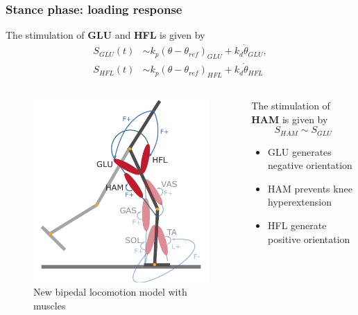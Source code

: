 \documentclass[10pt]{beamer}
\begin{document}
\begin{frame}
	\frametitle{Stance phase: loading response}
	
	\begin{block}{}
		The stimulation of \textbf{GLU} and \textbf{HFL}  is given by
		\begin{align*}
			S_{GLU}(t) &\sim k_p (\theta-\theta_{ref})_{GLU} + k_d \dot{\theta}_{GLU}, \\
			S_{HFL}(t) &\sim k_p (\theta-\theta_{ref})_{HFL} + k_d \dot{\theta}_{HFL}
		\end{align*}
	\end{block}
	
	\begin{columns}
		\begin{column}{.5\textwidth}
			\begin{figure}
				\centering
				\includegraphics[height=.45\textheight]{images/new_model/stance/muscle_vas_sol_gas_ta_ham_glu_hfl_floor.pdf}
				\caption{New bipedal locomotion model with muscles}	
			\end{figure}
		\end{column}
		\begin{column}{.5\textwidth}
			\begin{block}{}
				The stimulation of \textbf{HAM} is given by	
				\begin{equation*}
					S_{HAM} \sim S_{GLU}
				\end{equation*}
			\end{block}		
			
			\begin{itemize}
				\item GLU generates negative orientation
				\item HAM prevents knee hyperextension
				\item HFL generate positive orientation				
			\end{itemize}
		\end{column}
	\end{columns}
\end{frame}
\end{document}
